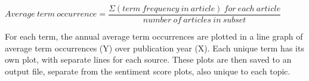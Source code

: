 \documentclass{report}
\begin{document}
\begin{center}
	$Average \ term \ occurrence = \dfrac{\Sigma (term \ frequency \ in \ article) \ for \ each \ article}{number \ of \ articles \ in \ subset}$
\end{center}

For each term, the annual average term occurrences are plotted in a line graph of average term occurrences (Y) over publication year (X).
Each unique term has its own plot, with separate lines for each source. 
These plots are then saved to an output file, separate from the sentiment score plots, also unique to each topic. 





\end{document}
